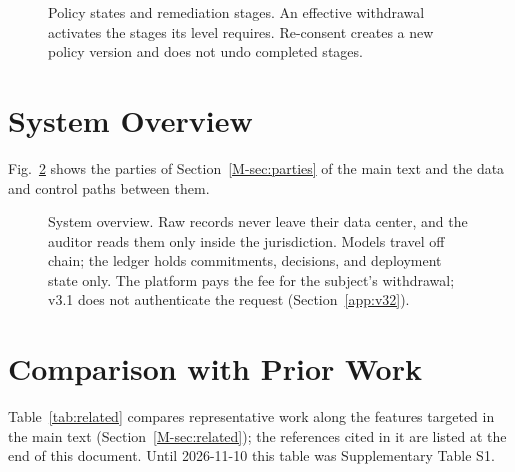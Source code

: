 \begin{figure}[h]
\centering
{}
\caption{Policy states and remediation stages. An effective withdrawal activates the stages its level requires. Re-consent creates a new policy version and does not undo completed stages.}
\label{fig:states}
\end{figure}

\section{System Overview}
\label{app:overview}
Fig.~\ref{fig:overview} shows the parties of Section~\ref{M-sec:parties} of the main text and the data and control paths between them.

\begin{figure}[t]
\centering
{}
\caption{System overview. Raw records never leave their data center, and the auditor reads them only inside the jurisdiction. Models travel off chain; the ledger holds commitments, decisions, and deployment state only. The platform pays the fee for the subject's withdrawal; v3.1 does not authenticate the request (Section~\ref{app:v32}).}
\label{fig:overview}
\end{figure}

\section{Comparison with Prior Work}
\label{app:related}
Table~\ref{tab:related} compares representative work along the features targeted in the main text (Section~\ref{M-sec:related}); the references cited in it are listed at the end of this document. Until 2026-11-10 this table was Supplementary Table S1.

